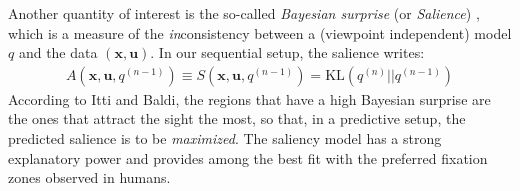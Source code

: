 \documentclass{article}
\begin{document}
Another quantity of interest is the so-called \emph{Bayesian surprise} (or \emph{ Salience}) \citep{itti2005bayesian},
which is a measure of the \emph{in}consistency between a (viewpoint independent)  model $q$ and the data $(\boldsymbol{x}, \boldsymbol{u})$. 
In our sequential setup, the salience writes:
\begin{align}
A(\boldsymbol{x}, \boldsymbol{u}, q^{(n-1)}) \equiv S(\boldsymbol{x},\boldsymbol{u}, q^{(n-1)}) = \text{KL}(q^{(n)}||q^{(n-1)})
\label{eq:saliency}
\end{align}
According to Itti and Baldi, the regions that have a high Bayesian surprise are the ones that attract the sight the most, so that, in a predictive setup, the predicted salience is to be \emph{maximized}.
The saliency model has a strong explanatory power and provides among the best fit with the preferred fixation zones observed in humans.
\end{document}

